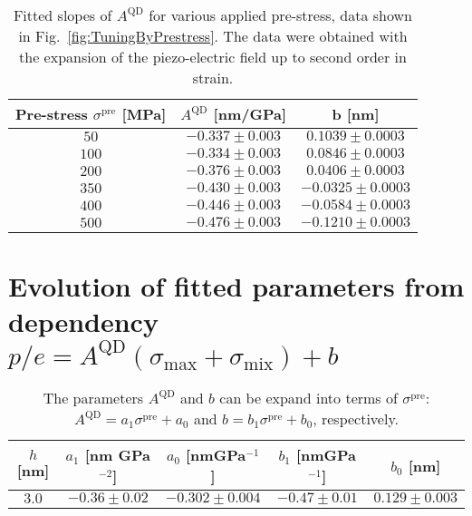  		\begin{table}[ht!]
 			\centering
 			\caption{Fitted slopes of $A^{\mathrm{QD}}$ for various applied pre-stress, data shown in Fig.~\ref{fig:TuningByPrestress}. The data were obtained with the expansion of the piezo-electric field up to second order in strain.}
 			\label{tab:prestress_slopes}
 			\begin{tabular}{|c|c|c|}
 				\hline
 				Pre-stress $\sigma^\mathrm{pre}$ [MPa]		& $A^{\mathrm{QD}}$ [nm/GPa]    & b   [nm]    \\ \hline
 				$50$  &$-0.337 \pm 0.003$  & $0.1039 \pm 0.0003 $    \\ \hline
 				$100$	&$-0.334 \pm 0.003$  & $0.0846 \pm 0.0003 $     \\ \hline
 				$200$  &$-0.376 \pm 0.003$  & $0.0406\pm 0.0003 $    \\ \hline
 				$350$	&$-0.430 \pm 0.003$  & $-0.0325 \pm 0.0003$      \\ \hline
 				$400$  &$-0.446 \pm 0.003$  & $-0.0584 \pm 0.0003$    \\ \hline
 				$500$	&$-0.476 \pm 0.003$  & $-0.1210 \pm 0.0003$      \\ \hline
 			\end{tabular}    
 		\end{table}
 		
\newpage
\section*{Evolution of fitted parameters from dependency $p/e = A^\mathrm{QD} \left(\sigma_\mathrm{max}+\sigma_\mathrm{mix}\right) + b$}
%
\label{app:empirical_model}

 		
 		\begin{table}[ht!]
 			\centering
 			\caption{The parameters $A^\mathrm{QD}$ and $b$ can be expand into terms of $\sigma^\mathrm{pre}$: $A^\mathrm{QD}=a_1\sigma^\mathrm{pre}+a_0$ and $b=b_1\sigma^\mathrm{pre}+b_0$, respectively.}
 			\label{tab:prestress_fit}
 			\begin{tabular}{|c|c|c||c|c|}
 				\hline
 				$h$ [nm]		   & $a_1$   [nm GPa$^{-2}$]  &$a_0$ [nmGPa$^{-1}$] & $b_1$ [nmGPa$^{-1}$] & $b_0$ [nm] \\ \hline
 			$3.0$   & $-0.36 \pm 0.02$  &  $-0.302 \pm 0.004$ & $-0.47 \pm 0.01$ & $0.129\pm0.003$ \\ \hline %
 			\end{tabular}    
 		\end{table}
 		
